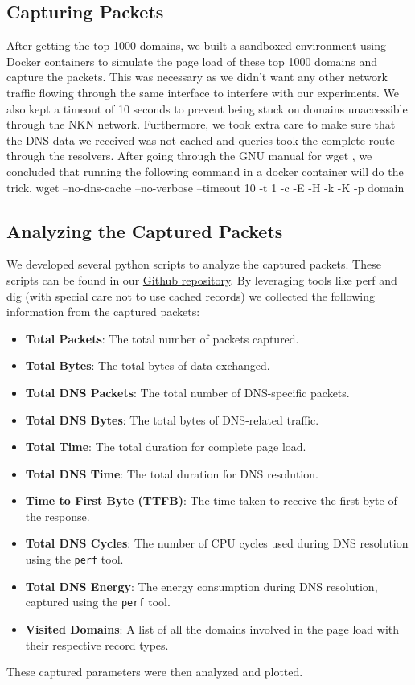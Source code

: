 \documentclass[conference]{IEEEtran}
\begin{document}
\subsection{Capturing Packets}
After getting the top 1000 domains, we built a sandboxed environment using Docker containers to simulate the page load of these top 1000 domains and capture the packets. This was necessary as we didn't want any other network traffic flowing through the same interface to interfere with our experiments. We also kept a timeout of 10 seconds to prevent being stuck on domains unaccessible through the NKN network. Furthermore, we took extra care to make sure that the DNS data we received was not cached and queries took the complete route through the resolvers. After going through the GNU manual for wget \cite{wget}, we concluded that running the following command in a docker container will do the trick. wget --no-dns-cache --no-verbose --timeout 10 -t 1 -c -E -H -k -K -p domain

\subsection{Analyzing the Captured Packets}
We developed several python scripts to analyze the captured packets. These scripts can be found in our \href{https://github.com/SachinJalan/DNS-Renaissance}{Github repository}. By leveraging tools like perf and dig (with special care not to use cached records) we collected the following information from the captured packets:
\begin{itemize}
    \item \textbf{Total Packets}: The total number of packets captured.
    \item \textbf{Total Bytes}: The total bytes of data exchanged.
    \item \textbf{Total DNS Packets}: The total number of DNS-specific packets.
    \item \textbf{Total DNS Bytes}: The total bytes of DNS-related traffic.
    \item \textbf{Total Time}: The total duration for complete page load.
    \item \textbf{Total DNS Time}: The total duration for DNS resolution.
    \item \textbf{Time to First Byte (TTFB)}: The time taken to receive the first byte of the response.
    \item \textbf{Total DNS Cycles}: The number of CPU cycles used during DNS resolution using the \texttt{perf} tool.
    \item \textbf{Total DNS Energy}: The energy consumption during DNS resolution, captured using the \texttt{perf} tool.
    \item \textbf{Visited Domains}: A list of all the domains involved in the page load with their respective record types.
\end{itemize}
These captured parameters were then analyzed and plotted.
\end{document}
